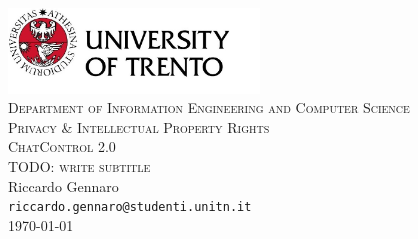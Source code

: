 \pagestyle{plain}

\thispagestyle{empty}

\begin{center}

  \includegraphics[width=0.5\textwidth]{I-initFolder/images/maxresdefault1.jpg}\\[1.0cm]

  \textsc{\Large Department of Information Engineering and Computer Science}\\[2.5cm]

  \textsc{\Large Privacy \& Intellectual Property Rights}\\[0.8cm]

  \textsc{\Huge ChatControl 2.0}\\[0.8cm]

  \textsc{\Large TODO: write subtitle}\\[2.0cm]

  \vspace{1cm}
  {\Large Riccardo Gennaro}\\[0.3cm]
  \texttt{riccardo.gennaro@studenti.unitn.it}\\[2.5cm]

  {\large \today}

\end{center}        

